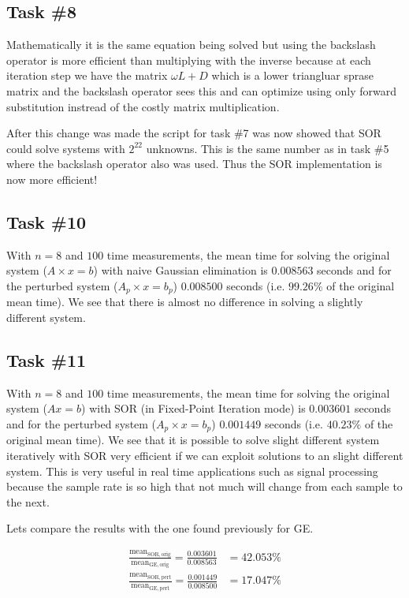 \documentclass[10pt, a4paper]{article}
\begin{document}
\subsection{Task \#8}
Mathematically it is the same equation being solved but using the backslash operator is more efficient than multiplying with the inverse because at each iteration step we have the matrix $\omega L + D$ which is a lower triangluar sprase matrix and the backslash operator sees this and can optimize using only forward substitution instread of the costly matrix multiplication.

After this change was made the script for task \#7 was now showed that SOR could solve systems with $2^{22}$ unknowns. This is the same number as in task \#5 where the backslash operator also was used. Thus the SOR implementation is now more efficient!

\subsection{Task \#10}
With $n=8$ and $100$ time measurements, the mean time for solving the original system ($A\times x=b$) with naive Gaussian elimination is $0.008563$ seconds  and for the perturbed system ($A_p\times x=b_p$) $0.008500$ seconds (i.e. $99.26\%$ of the original mean time). We see that there is almost no difference in solving a slightly different system.

\subsection{Task \#11}
With $n=8$ and $100$ time measurements, the mean time for solving the original system ($Ax=b$) with SOR (in Fixed-Point Iteration mode) is $0.003601$ seconds and for the perturbed system ($A_p\times x=b_p$) $0.001449$ seconds (i.e. $40.23\%$ of the original mean time). We see that it is possible to solve slight different system iteratively with SOR very efficient if we can exploit solutions to an slight different system. This is very useful in real time applications such as signal processing because the sample rate is so high that not much will change from each sample to the next.

Lets compare the results with the one found previously for GE.

\begin{eqnarray}
	\frac{\mathrm{mean}_{\mathrm{SOR, orig}}}{\mathrm{mean}_{\mathrm{GE, orig}}}=\frac{0.003601}{0.008563} & =42.053\% \\ \nonumber
	\frac{\mathrm{mean}_{\mathrm{SOR, pert}}}{\mathrm{mean}_{\mathrm{GE, pert}}}=\frac{0.001449}{0.008500} & =17.047\% \nonumber
\end{eqnarray}
\end{document}
